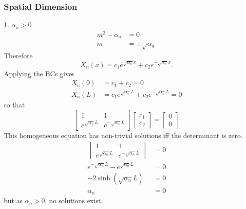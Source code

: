 \documentclass{article}
\begin{document}
\subsubsection{Spatial Dimension}
\begin{proofcase}{1. \(\alpha_n > 0\)}\let\qed\relax
    \begin{align*}
        m^2 - \alpha_n & = 0                     \\
        m              & = \pm \sqrt{ \alpha_n }
    \end{align*}
    Therefore
    \begin{equation*}
        X_n\left( x \right) = c_1 e^{\sqrt{ \alpha_n } x} + c_2 e^{-\sqrt{ \alpha_n } x}.
    \end{equation*}
    Applying the BCs gives
    \begin{align*}
        X_n\left( 0 \right) & = c_1 + c_2 = 0                                              \\
        X_n\left( L \right) & = c_1 e^{\sqrt{\alpha_n} L} + c_2 e^{-\sqrt{\alpha_n} L} = 0
    \end{align*}
    so that
    \begin{equation*}
        \begin{bmatrix*}
            1 & 1 \\
            e^{\sqrt{\alpha_n} L} & e^{-\sqrt{\alpha_n} L}
        \end{bmatrix*}
        \begin{bmatrix*}
            c_1 \\
            c_2
        \end{bmatrix*}
        =
        \begin{bmatrix*}
            0 \\
            0
        \end{bmatrix*}
    \end{equation*}
    This homogeneous equation has non-trivial solutions iff the determinant is zero.
    \begin{align*}
        \begin{vmatrix*}
            1 & 1 \\
            e^{\sqrt{\alpha_n} L} & e^{-\sqrt{\alpha_n} L}
        \end{vmatrix*}
                                                       & = 0 \\
        e^{-\sqrt{\alpha_n} L} - e^{\sqrt{\alpha_n} L} & = 0 \\
        -2\sinh{\left( \sqrt{\alpha_n} L \right)}      & = 0 \\
        \alpha_n                                       & = 0
    \end{align*}
    but as \(\alpha_n > 0\), no solutions exist.
\end{proofcase}
\end{document}
